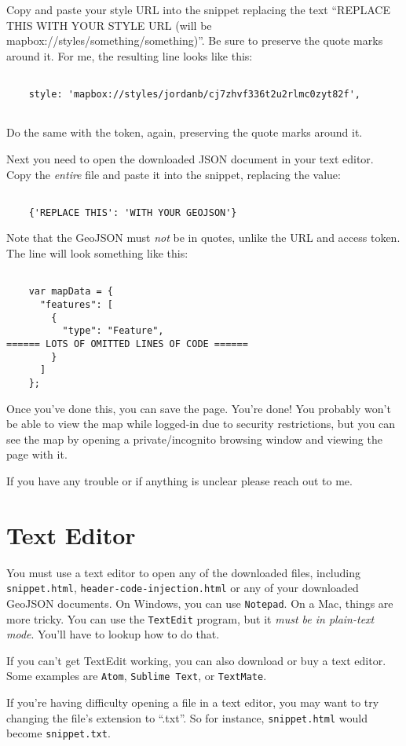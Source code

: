 \documentclass[11pt]{article}
\begin{document}
Copy and paste your style URL into the snippet replacing the text
``REPLACE THIS WITH YOUR STYLE URL (will be
mapbox://styles/something/something)''. Be sure to preserve the quote
marks around it. For me, the resulting line looks like this:

\begin{verbatim}

    style: 'mapbox://styles/jordanb/cj7zhvf336t2u2rlmc0zyt82f',
  
\end{verbatim}

Do the same with the token, again, preserving the quote marks around it.

Next you need to open the downloaded JSON document in your text
editor. Copy the \emph{entire} file and paste it into the snippet,
replacing the value:

\begin{verbatim}

    {'REPLACE THIS': 'WITH YOUR GEOJSON'}

\end{verbatim}

Note that the GeoJSON must \emph{not} be in quotes, unlike the URL and
access token. The line will look something like this:

\begin{verbatim}

    var mapData = {
      "features": [
        {
          "type": "Feature",
====== LOTS OF OMITTED LINES OF CODE ======
        }
      ]
    };

\end{verbatim}

Once you've done this, you can save the page. You're done! You
probably won't be able to view the map while logged-in due to security
restrictions, but you can see the map by opening a private/incognito
browsing window and viewing the page with it.

If you have any trouble or if anything is unclear please reach out to
me.

\appendix

\section{Text Editor}
\label{texteditor}

You must use a text editor to open any of the downloaded files,
including \texttt{snippet.html}, \texttt{header-code-injection.html}
or any of your downloaded GeoJSON documents. On Windows, you can use
\texttt{Notepad}. On a Mac, things are more tricky. You can use the
\texttt{TextEdit} program, but it \emph{must be in plain-text
  mode}. You'll have to lookup how to do that.

If you can't get TextEdit working, you can also download or buy a text
editor. Some examples are \texttt{Atom}, \texttt{Sublime Text}, or
\texttt{TextMate}.

If you're having difficulty opening a file in a text editor, you may
want to try changing the file's extension to ``.txt''. So for
instance, \texttt{snippet.html} would become \texttt{snippet.txt}.
\end{document}
